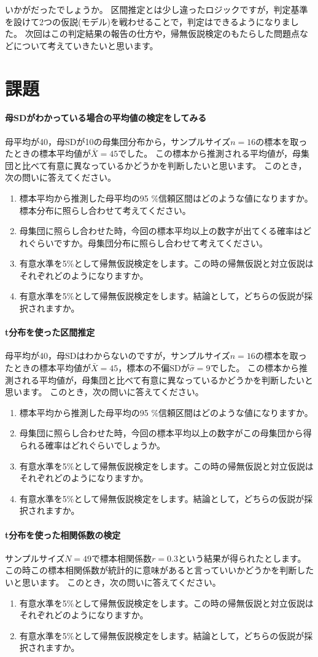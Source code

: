 \documentclass{ltjsbook}
\begin{document}
いかがだったでしょうか。
区間推定とは少し違ったロジックですが，判定基準を設けて2つの仮説(モデル)を戦わせることで，判定はできるようになりました。
次回はこの判定結果の報告の仕方や，帰無仮説検定のもたらした問題点などについて考えていきたいと思います。

\section{課題}
\paragraph{母SDがわかっている場合の平均値の検定をしてみる}
母平均が40，母SDが10の母集団分布から，サンプルサイズ$n=16$の標本を取ったときの標本平均値が$\bar{X}=45$でした。
この標本から推測される平均値が，母集団と比べて有意に異なっているかどうかを判断したいと思います。
このとき，次の問いに答えてください。
\begin{enumerate}
	\item 標本平均から推測した母平均の95 \%信頼区間はどのような値になりますか。標本分布に照らし合わせて考えてください。
	\item 母集団に照らし合わせた時，今回の標本平均以上の数字が出てくる確率はどれぐらいですか。母集団分布に照らし合わせて考えてください。
	\item 有意水準を5\%として帰無仮説検定をします。この時の帰無仮説と対立仮説はそれぞれどのようになりますか。
	\item 有意水準を5\%として帰無仮説検定をします。結論として，どちらの仮説が採択されますか。
\end{enumerate}

\paragraph{t分布を使った区間推定}
母平均が40，母SDはわからないのですが，サンプルサイズ$n=16$の標本を取ったときの標本平均値が$\bar{X}=45$，標本の不偏SDが$\hat{\sigma}=9$でした。
この標本から推測される平均値が，母集団と比べて有意に異なっているかどうかを判断したいと思います。
このとき，次の問いに答えてください。
\begin{enumerate}
	\item 標本平均から推測した母平均の95 \%信頼区間はどのような値になりますか。
	\item 母集団に照らし合わせた時，今回の標本平均以上の数字がこの母集団から得られる確率はどれぐらいでしょうか。
	\item 有意水準を5\%として帰無仮説検定をします。この時の帰無仮説と対立仮説はそれぞれどのようになりますか。
	\item 有意水準を5\%として帰無仮説検定をします。結論として，どちらの仮説が採択されますか。
\end{enumerate}

\paragraph{t分布を使った相関係数の検定}
サンプルサイズ$N=49$で標本相関係数$r = 0.3$という結果が得られたとします。この時この標本相関係数が統計的に意味があると言っていいかどうかを判断したいと思います。
このとき，次の問いに答えてください。
\begin{enumerate}
	\item 有意水準を5\%として帰無仮説検定をします。この時の帰無仮説と対立仮説はそれぞれどのようになりますか。
	\item 有意水準を5\%として帰無仮説検定をします。結論として，どちらの仮説が採択されますか。
\end{enumerate}
\end{document}
